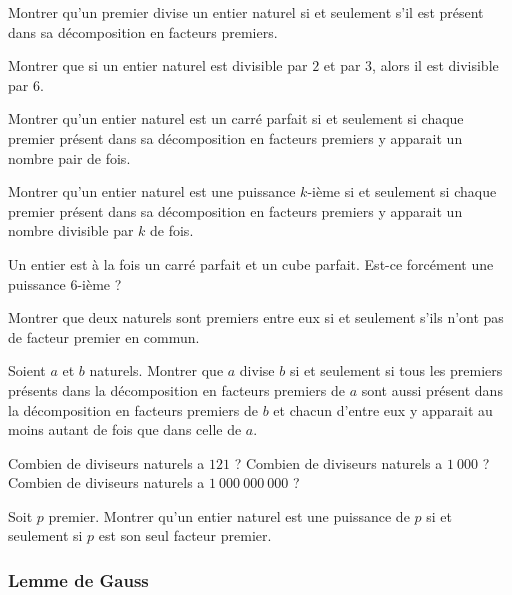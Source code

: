\begin{exo}
Montrer qu'un premier divise un entier naturel si et seulement s’il est présent dans sa décomposition en facteurs premiers.
\end{exo}


\begin{exo}
Montrer que si un entier naturel est divisible par $2$ et par $3$, alors il est divisible par $6$.
\end{exo}


\begin{exo}
Montrer qu’un entier naturel est un carré parfait si et seulement si chaque premier présent dans sa décomposition en facteurs premiers y apparait un nombre pair de fois.

Montrer qu’un entier naturel est une puissance $k$-ième si et seulement si chaque premier présent dans sa décomposition en facteurs premiers y apparait un nombre divisible par $k$ de fois.
\end{exo}


\begin{exo}
Un entier est à la fois un carré parfait et un cube parfait. Est-ce forcément une puissance $6$-ième ?
\end{exo}


\begin{exo}
Montrer que deux naturels sont premiers entre eux si et seulement s’ils n'ont pas de facteur premier en commun.
\end{exo}


\begin{exo}
Soient $a$ et $b$ naturels. Montrer que $a$ divise $b$ si et seulement si tous les premiers présents dans la décomposition en facteurs premiers de $a$ sont aussi présent dans la décomposition en facteurs premiers de $b$ et chacun d'entre eux y apparait au moins autant de fois que dans celle de $a$.
\end{exo}


\begin{exo}
Combien de diviseurs naturels a $121$ ?
Combien de diviseurs naturels a $1\ 000$ ?
Combien de diviseurs naturels a $1\ 000\ 000\ 000$ ?
\end{exo}

\begin{exo}
Soit $p$ premier. Montrer qu'un entier naturel est une puissance de $p$ si et seulement si $p$ est son seul facteur premier.
\end{exo}


\subsubsection{Lemme de Gauss}


